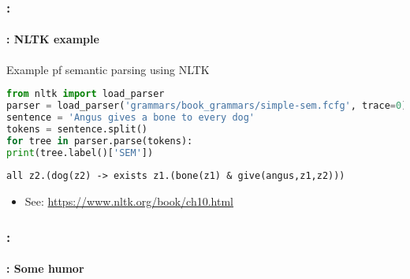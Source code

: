 \documentclass[xcolor=table]{beamer}
\begin{document}
\begin{frame}[fragile]
	\frametitle{\insertshortsubtitle: \insertsection}
	\framesubtitle{\insertsubsection: NLTK example}
	
	\begin{exampleblock}{Example pf semantic parsing using NLTK}
		{\scriptsize
			\begin{lstlisting}[language=Python]
from nltk import load_parser
parser = load_parser('grammars/book_grammars/simple-sem.fcfg', trace=0)
sentence = 'Angus gives a bone to every dog'
tokens = sentence.split()
for tree in parser.parse(tokens):
print(tree.label()['SEM'])
			\end{lstlisting}
		}
		
		{\scriptsize\bfseries
			\begin{lstlisting}
all z2.(dog(z2) -> exists z1.(bone(z1) & give(angus,z1,z2)))
			\end{lstlisting}
		}
		
	\end{exampleblock}
	
	\begin{itemize}
		\item See: \url{https://www.nltk.org/book/ch10.html}
	\end{itemize}
	
\end{frame}

\begin{frame}
	\frametitle{\insertshortsubtitle: \insertsection}
	\framesubtitle{\insertsubsection: Some humor}
	
	\begin{center}
	\end{center}
	
\end{frame}

\end{document}
